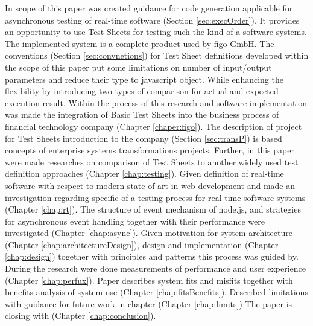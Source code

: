 In scope of this paper was created guidance for code generation applicable for asynchronous testing of real-time software (Section \ref{sec:execOrder}). It provides an opportunity to use Test Sheets for testing such the kind of a software systems. The implemented system is a complete product used by figo GmbH. The conventions (Section \ref{sec:convnetions}) for Test Sheet definitions developed within the scope of this paper put some limitations on number of input/output parameters and reduce their type to javascript object. While enhancing the flexibility by introducing two types of comparison for actual and expected execution result. Within the process of this research and software implementation was made the integration of Basic Test Sheets into the business process of financial technology company (Chapter \ref{chaper:figo}).
The description of project for Test Sheets introduction to the company (Section \ref{sec:transP}) is based concepts of enterprise systems transformations projects.
Further, in this paper were made researches on comparison of Test Sheets to another widely used test definition approaches (Chapter \ref{chap:testing}). 
Given definition of real-time software with respect to modern state of art in web development and made an investigation regarding specific of a testing process for real-time software systems (Chapter \ref{chap:rt}).
The structure of event mechanism of node.js, and strategies for asynchronous event handling together with their performance were investigated (Chapter \ref{chap:async}). 
Given motivation for system architecture (Chapter \ref{chap:architectureDesign}), design and implementation (Chapter \ref{chap:design}) together with principles and patterns this process was guided by. 
During the research were done measurements of performance  and user experience (Chapter  \ref{chap:perfux}). 
Paper describes system fits and misfits together with benefits analysis of system use (Chapter \ref{chap:fitsBenefits}).
Described limitations with guidance for future work in chapter (Chapter \ref{chap:limits}) The paper is closing with (Chapter \ref{chap:conclusion}).



